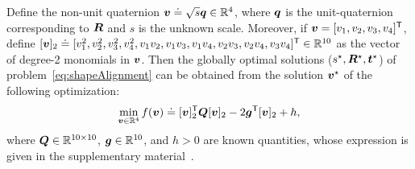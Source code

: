 \begin{proposition} \label{prop:quaternionRotationShapeAlignment}
Define the non-unit quaternion ${\bm v} \doteq \sqrt{s}{\bm q} \in { {\mathbb R}^{4} }$, where ${\bm q}$ is the unit-quaternion corresponding to ${\bm R}$ and $s$ is the unknown scale.
 Moreover, if ${\bm v} = [v_1, v_2, v_3, v_4]^{\mathsf{T}}$, define $[{\bm v}]_2 \doteq [v_1^2,v_2^2,v_3^2,v_4^2,v_1v_2,v_1v_3,v_1v_4,v_2v_3,v_2v_4,v_3v_4]^{\mathsf{T}} \in { {\mathbb R}^{10} }$ as the vector of degree-2 monomials in ${\bm v}$.
  Then the globally optimal solutions ($s^\star, {\bm R}^\star, {\bm t}^\star$) of problem~\eqref{eq:shapeAlignment} can be obtained from the  solution ${\bm v}^\star$ of the following optimization:
\begin{equation} \label{eq:quaternionRotationShapeAlignment}
\min_{\vv \in \Real{4}} f(\vv) \doteq [\vv]_2\tran \MQ [\vv]_2 - 2 \vg\tran [\vv]_2 + h, %
\end{equation}
where ${\bm Q} \in { {\mathbb R}^{10\times10} }$, ${\bm g} \in{ {\mathbb R}^{10} }$, and $h>0$ are known quantities, whose expression is given in the supplementary material~\cite{Yang20tr-GNC}.
\end{proposition}

